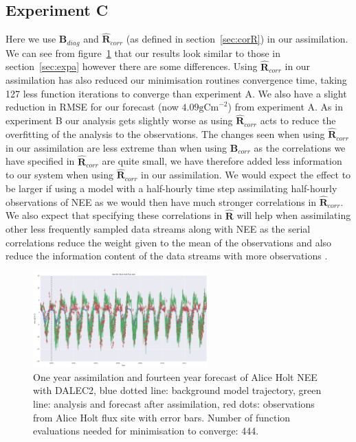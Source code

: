 \documentclass[11pt]{article}
\begin{document}
\subsection{Experiment C} \label{sec:expc}

Here we use $\textbf{B}_{diag}$ and $\hat{\textbf{R}}_{corr}$ (as defined in section~\ref{sec:corR}) in our assimilation. We can see from figure~\ref{fig:4dvardiagBcorR} that our results look similar to those in section~\ref{sec:expa} however there are some differences. Using $\hat{\textbf{R}}_{corr}$ in our assimilation has also reduced our minimisation routines convergence time, taking 127 less function iterations to converge than experiment A. We also have a slight reduction in RMSE for our forecast (now $4.09 \text{gCm}^{-2}$) from experiment A. As in experiment B our analysis gets slightly worse as using $\hat{\textbf{R}}_{corr}$ acts to reduce the overfitting of the analysis to the observations. The changes seen when using $\hat{\textbf{R}}_{corr}$ in our assimilation are less extreme than when using $\textbf{B}_{corr}$ as the correlations we have specified in $\hat{\textbf{R}}_{corr}$ are quite small, we have therefore added less information to our system when using $\hat{\textbf{R}}_{corr}$ in our assimilation. We would expect the effect to be larger if using a model with a half-hourly time step assimilating half-hourly observations of NEE as we would then have much stronger correlations in $\hat{\textbf{R}}_{corr}$. We also expect that specifying these correlations in  $\hat{\textbf{R}}$ will help when assimilating other less frequently sampled data streams along with NEE as the serial correlations reduce the weight given to the mean of the observations and also reduce the information content of the data streams with more observations \citep{jarvinen1999variational, Daley1992}.

\begin{figure}[ht]
    \centering
    \includegraphics[width=0.6\textwidth]{bdiagr_corr_cor03_tau4_cutoff4_var05_4dvar.png}
    \caption{One year assimilation and fourteen year forecast of Alice Holt NEE with DALEC2, blue dotted line: background model trajectory, green line: analysis and forecast after assimilation, red dots: observations from Alice Holt flux site with error bars. Number of function evaluations needed for minimisation to converge: 444.}
    \label{fig:4dvardiagBcorR}
\end{figure}
\end{document}
